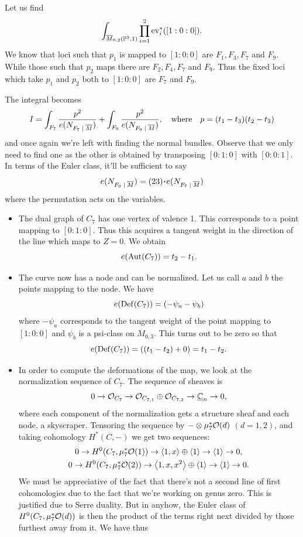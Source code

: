 \documentclass[12pt]{memoir}
\begin{document}
\begin{Ex}
    Let us find 
    $$\int_{\overline{M}_{0,2}(\mathbb{P}^2,1)}\prod_{i=1}^{2}\operatorname{ev}_i^\ast([1:0:0]).$$
    We know that loci such that $p_1$ is mapped to $[1:0:0]$ are $F_1,F_3,F_7$ and $F_9$. While those such that $p_2$ maps there are $F_2,F_4,F_7$ and $F_9$. Thus the fixed loci which take $p_1$ and $p_2$ both to $[1:0:0]$ are $F_7$ and $F_9$.\par
    The integral becomes 
    $$I=\int_{F_7}\frac{p^2}{e(N_{F_7\mid\ov M})}+\int_{F_9}\frac{p^2}{e(N_{F_9\mid\ov M})},\word{where}p=(t_1-t_3)(t_2-t_3)$$
    and once again we're left with finding the normal bundles. Observe that we only need to find one as the other is obtained by transposing $[0:1:0]$ with $[0:0:1]$. In terms of the Euler class, it'll be sufficient to say 
    $$e(N_{F_9\mid\ov M})=(23)\.e(N_{F_7\mid\ov M})$$
    where the permutation acts on the variables.
    \begin{itemize}
        \item The dual graph of $C_7$ has one vertex of valence 1. This corresponds to a point mapping to $[0:1:0]$. Thus this acquires a tangent weight in the direction of the line which maps to $Z=0$. We obtain 
        $$e(\operatorname{Aut}(C_7))=t_2-t_1.$$
        \item The curve now has a node and can be normalized. Let us call $a$ and $b$ the points mapping to the node.
        We have 
        $$e(\operatorname{Def}(C_7))=(-\psi_a-\psi_b)$$
        where $-\psi_a$ corresponds to the tangent weight of the point mapping to $[1:0:0]$ and $\psi_b$ is a psi-class on $M_{0,3}$. This turns out to be zero so that 
        $$e(\operatorname{Def}(C_7))=((t_1-t_2)+0)=t_1-t_2.$$
        \item In order to compute the deformations of the map, we look at the normalization sequence of $C_7$. The sequence of sheaves is 
        $$0\to\mathcal{O}_{C_7}\to\mathcal{O}_{C_{7,1}}\oplus\mathcal{O}_{C_{7,2}}\to\underline{\mathbb{C}}_{n}\to0,$$
        where each component of the normalization gets a structure sheaf and each node, a skyscraper. Tensoring the sequence by $-\otimes \mu_7^\ast\mathcal{O}(d)$ $(d=1,2)$, and taking cohomology $H^\ast(C,-)$ we get two sequences:
        \begin{gather*}
            0\to H^0(C_7,\mu_7^\ast\mathcal{O}(1))\to\left\langle 1,x\right\rangle\oplus\left\langle 1\right\rangle\to\left\langle 1\right\rangle\to 0,\\
            0\to H^0(C_7,\mu_7^\ast\mathcal{O}(2))\to\left\langle 1,x,x^2\right\rangle\oplus\left\langle 1\right\rangle\to\left\langle 1\right\rangle\to 0.
        \end{gather*}
        We must be appreciative of the fact that there's not a second line of first cohomologies due to the fact that we're working on genus zero. This is justified due to Serre duality. But in anyhow, the Euler class of $H^0(C_7,\mu_7^\ast\mathcal{O}(d))$ is then the product of the terms right next divided by those furthest away from it. We have thus 

\end{itemize}
\end{Ex}
\end{document}
